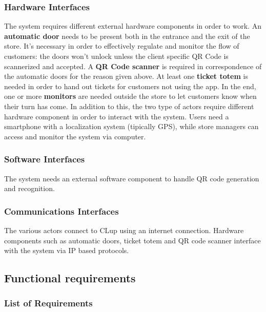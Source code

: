 \documentclass[]{article}
\begin{document}
		
			\subsubsection{Hardware Interfaces}
			The system requires different external hardware components in order to work. \newline
			An \textbf{automatic door} needs to be present both in the entrance and the exit of the store. It's necessary in order to effectively regulate and monitor the flow of customers: the doors won't unlock unless the client specific QR Code is scannerized and accepted. \newline
			A \textbf{QR Code scanner} is required in correspondence of the automatic doors for the reason given above. \newline
			At least one \textbf{ticket totem} is needed in order to hand out tickets for customers not using the app. \newline
			In the end, one or more \textbf{monitors} are needed outside the store to let customers know when their turn has come. \newline \newline
			In addition to this, the  two type of actors require different hardware component in order to interact with the system. \newline
			Users need a smartphone with a localization system (tipically GPS), while store managers can access and monitor the system via computer.
			\subsubsection{Software Interfaces}
			The system needs an external software component to handle QR code generation and recognition.
			\subsubsection{Communications Interfaces}
			The various actors connect to CLup using an internet connection. \newline
			Hardware components such as automatic doors, ticket totem and QR code scanner interface with the system via IP based protocols.
		
		
		\subsection{Functional requirements}
			
			\subsubsection{List of Requirements}
				
\end{document}
